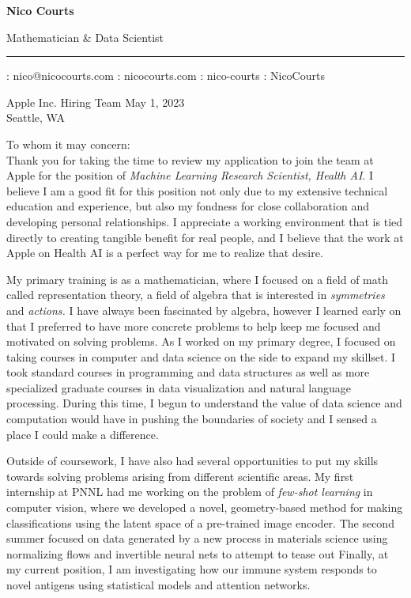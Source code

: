 \documentclass[12pt]{article} %
\begin{document}
\thispagestyle{empty}

\centerline{\large\bf Nico Courts} %
\centerline{Mathematician \& Data Scientist} %
\medskip\hrule\smallskip

\centerline{\small \faEnvelope: nico@nicocourts.com \hspace{0.3in} \faChain: nicocourts.com \hspace{0.3in}\faLinkedinSquare: nico-courts \hspace{0.3in}\faGithubAlt: NicoCourts}

\vspace{0.3in}

\noindent Apple Inc. Hiring Team \hfill May 1, 2023\\
Seattle, WA\\\vspace{0.2in}

\noindent To whom it may concern:\hfill\\

Thank you for taking the time to review my application to join the team at Apple
for the position of \textit{Machine Learning Research Scientist, Health AI}. I believe I am 
a good fit for this position not only due to my extensive technical education and experience,
but also my fondness for close collaboration and developing personal relationships. I appreciate
a working environment that is tied directly to creating tangible benefit for real people, and
I believe that the work at Apple on Health AI is a perfect way for me to realize that desire.

My primary training is as a mathematician, where I focused on a field of math called 
representation theory, a field of algebra that is interested in \textit{symmetries} and \textit{actions.}
I have always been fascinated by algebra, however I learned early on that I preferred to have
more concrete problems to help keep me focused and motivated on solving problems. 
As I worked on my primary degree, I focused on taking courses in computer and data science on the 
side to expand my skillset. I took standard courses in programming and data structures as well as 
more specialized graduate courses in data visualization and natural language processing.
During this time, I begun to understand the value of data science and computation would have in 
pushing the boundaries of society and I sensed a place I could make a difference.

Outside of coursework, I have also had several opportunities to put my skills towards solving
problems arising from different scientific areas. My first internship at PNNL had me working
on the problem of \textit{few-shot learning} in computer vision, where we developed a novel, geometry-based
method for making classifications using the latent space of a pre-trained image encoder. The second summer
focused on data generated by a new process in materials science using normalizing flows and invertible 
neural nets to attempt to tease out  Finally, at my current position, I am investigating
how our immune system responds to novel antigens using statistical models and attention networks.
\end{document}

